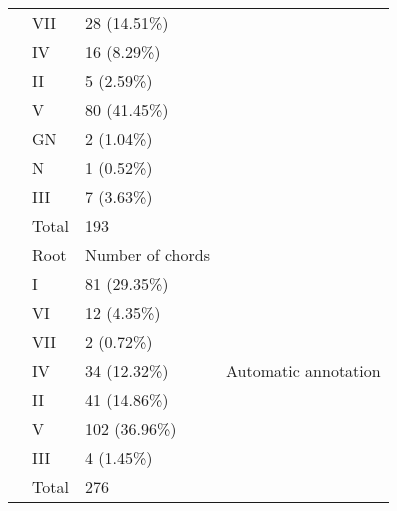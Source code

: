 \begin{table}[]
\begin{tabular}{llll}
 & VII & 28 (14.51\%) &  \\
 & IV & 16 (8.29\%) &  \\
 & II & 5 (2.59\%) &  \\
 & V & 80 (41.45\%) &  \\
 & GN & 2 (1.04\%) &  \\
 & N & 1 (0.52\%) &  \\
 & III & 7 (3.63\%) &  \\
 & Total & 193 &  \\
 & Root & Number of chords & \multirow{9}{*}{Automatic annotation} \\
 & I & 81 (29.35\%) &  \\
 & VI & 12 (4.35\%) &  \\
 & VII & 2 (0.72\%) &  \\
 & IV & 34 (12.32\%) &  \\
 & II & 41 (14.86\%) &  \\
 & V & 102 (36.96\%) &  \\
 & III & 4 (1.45\%) &  \\
 & Total & 276 &
\end{tabular}
\label{my-label}
\end{table}

\newpage
